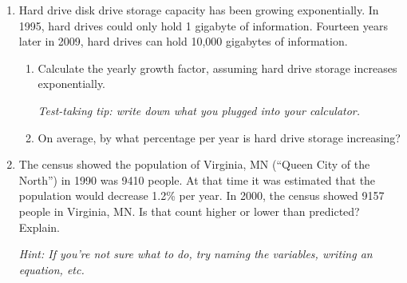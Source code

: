 \documentclass[12pt]{article}
\begin{document}
\begin{enumerate}
\newpage
\item Hard drive disk drive storage capacity has been growing exponentially.  In 1995, hard drives could only hold 1 gigabyte of information.  Fourteen years later in 2009, hard drives can hold 10,000 gigabytes of information.

\begin{enumerate}
\item Calculate the yearly growth factor, assuming hard drive storage increases exponentially.

\emph{Test-taking tip:  write down what you plugged into your calculator.}
\vfill
\vfill
\item On average, by what percentage per year is hard drive storage increasing?
\vfill
\end{enumerate}

\hrulefill
\item The census showed the population of Virginia, MN (``Queen City of the North'') in 1990 was 9410 people.  At that time it was estimated that the population would decrease 1.2\% per year.  In 2000, the census showed 9157 people in Virginia, MN.  Is that count higher or lower than predicted?  Explain.

\emph{Hint:  If you're not sure what to do, try naming the variables, writing an equation, etc.}
\vfill
\vfill
\vfill
\vfill





\end{enumerate}
\end{document}
